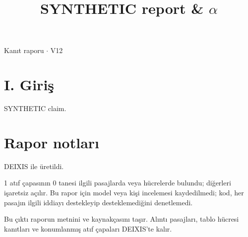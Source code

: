 \documentclass[journal]{IEEEtran}
\begin{document}
\renewcommand{\abstractname}{Özet}
\renewcommand{\IEEEkeywordsname}{Dizin Terimleri}
\renewcommand{\refname}{Kaynaklar}

\title{SYNTHETIC report \& \ensuremath{\alpha}}

\maketitle

\noindent Kanıt raporu \ensuremath{\cdot} V12

\section*{I. Giriş}

SYNTHETIC claim. \cite{Synth26}

\section*{Rapor notları}

DEIXIS ile üretildi.

1 atıf çapasının 0 tanesi ilgili pasajlarda veya hücrelerde bulundu; diğerleri işaretsiz açılır. Bu rapor için model veya kişi incelemesi kaydedilmedi; kod, her pasajın ilgili iddiayı destekleyip desteklemediğini denetlemedi.

Bu çıktı raporun metnini ve kaynakçasını taşır. Alıntı pasajları, tablo hücresi kanıtları ve konumlanmış atıf çapaları DEIXIS'te kalır.




\end{document}
